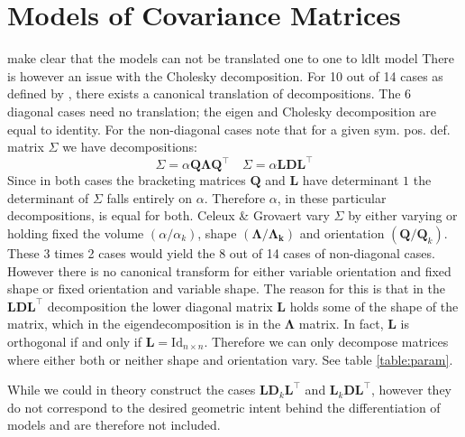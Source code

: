 \section{Models of Covariance Matrices}
\label{sec:models}

make clear that the models can not be translated one to one to ldlt model
There is however an issue with the Cholesky decomposition. For 10 out of 14
cases as defined by \cite{Cel95}, there exists a canonical translation of
decompositions.
The 6 diagonal cases need no translation; the eigen and Cholesky decomposition
are equal to identity.
For the non-diagonal cases note that for a given sym. pos. def. matrix
$ \Sigma $ we have decompositions:
\[\Sigma = \alpha \pmb{Q \Lambda Q}^\top \quad \Sigma =\alpha \pmb{L D L}^\top\]
Since in both cases the bracketing matrices $ \pmb{Q} $ and $ \pmb{L} $ have 
determinant $ 1 $ the determinant of $ \Sigma $ falls entirely on $ \alpha $.
Therefore $ \alpha $, in these particular decompositions, is equal for both.
Celeux \& Grovaert vary $\Sigma$ by either varying or holding fixed the volume 
$(\alpha / \alpha_k)$, shape $(\pmb{\Lambda} / \pmb{\Lambda_k})$ and orientation
$(\pmb{Q} / \pmb{Q}_k)$.
These 3 times 2 cases would yield the 8 out of 14 cases of non-diagonal cases.
However there is no canonical transform for either variable orientation and 
fixed shape or fixed orientation and variable shape.
The reason for this is that in the $\pmb{LDL}^\top$ decomposition the lower
diagonal matrix $\pmb{L}$ holds some of the shape of the matrix, which in 
the eigendecomposition is in the $\pmb{\Lambda}$ matrix.
In fact, $\pmb{L}$ is orthogonal if and only if 
$\pmb{L} = \mathrm{Id}_{n\times n}$.
Therefore we can only decompose matrices where either both or neither shape and
orientation vary. See table \ref{table:param}.

While we could in theory construct the cases $\pmb{L}\pmb{D}_k\pmb{L}^\top$ and
$\pmb{L}_k \pmb{D} \pmb{L}^\top$, however they do not correspond to the desired
geometric intent behind the differentiation of models and are therefore not 
included.


